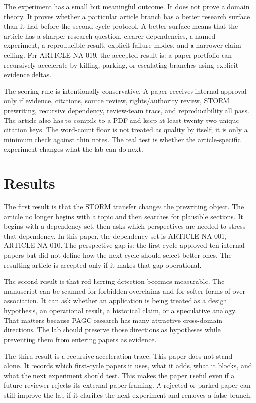 \documentclass[sigconf,nonacm]{acmart}
\begin{document}
The experiment has a small but meaningful outcome. It does not prove a domain
theory. It proves whether a particular article branch has a better research
surface than it had before the second-cycle protocol. A better surface means
that the article has a sharper research question, clearer dependencies, a named
experiment, a reproducible result, explicit failure modes, and a narrower claim
ceiling. For ARTICLE-NA-019, the accepted result is: a paper portfolio can recursively accelerate by killing, parking, or escalating branches using explicit evidence deltas.

The scoring rule is intentionally conservative. A paper receives internal
approval only if evidence, citations, source review, rights/authority review,
STORM prewriting, recursive dependency, review-team trace, and reproducibility
all pass. The article also has to compile to a PDF and keep at least twenty-two
unique citation keys. The word-count floor is not treated as quality by itself;
it is only a minimum check against thin notes. The real test is whether the
article-specific experiment changes what the lab can do next.

\section{Results}
The first result is that the STORM transfer changes the prewriting object. The
article no longer begins with a topic and then searches for plausible sections.
It begins with a dependency set, then asks which perspectives are needed to
stress that dependency. In this paper, the dependency set is ARTICLE-NA-001, ARTICLE-NA-010. The
perspective gap is: the first cycle approved ten internal papers but did not define how the next cycle should select better ones. The resulting article is accepted only if it makes
that gap operational.

The second result is that red-herring detection becomes measurable. The
manuscript can be scanned for forbidden overclaims and for softer forms of
over-association. It can ask whether an application is being treated as a design
hypothesis, an operational result, a historical claim, or a speculative analogy.
That matters because PAGC research has many attractive cross-domain directions.
The lab should preserve those directions as hypotheses while preventing them
from entering papers as evidence.

The third result is a recursive acceleration trace. This paper does not stand
alone. It records which first-cycle papers it uses, what it adds, what it blocks,
and what the next experiment should test. This makes the paper useful even if a
future reviewer rejects its external-paper framing. A rejected or parked paper
can still improve the lab if it clarifies the next experiment and removes a
false branch.
\end{document}
